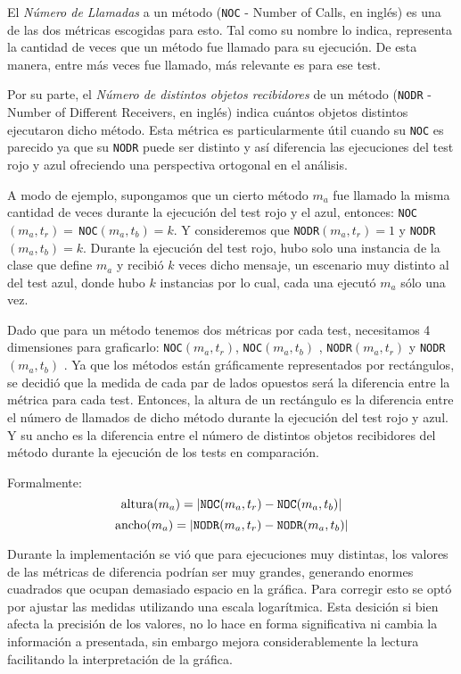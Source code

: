 \par El \emph{Número de Llamadas} a un método ({\tt NOC} - Number of Calls, en inglés) es una de las dos métricas escogidas para esto. Tal como su nombre lo indica, representa la cantidad de veces que un método fue llamado para su ejecución. De esta manera, entre más veces fue llamado, más relevante es para ese test.

\par Por su parte, el \emph{Número de distintos objetos recibidores} de un método ({\tt NODR} - Number of Different Receivers, en inglés) indica cuántos objetos distintos ejecutaron dicho método. Esta métrica es particularmente útil cuando su {\tt NOC} es parecido ya que su {\tt NODR} puede ser distinto y así diferencia las ejecuciones del test rojo y azul ofreciendo una perspectiva ortogonal en el análisis.

\par A modo de ejemplo, supongamos que un cierto método $m_a$ fue llamado la misma cantidad de veces durante la ejecución del test rojo y el azul, entonces: {\tt NOC}$(m_a,t_r) = \,${\tt NOC}$(m_a,t_b) = k$. Y consideremos que {\tt NODR}$(m_a,t_r) = 1$ y {\tt NODR}$(m_a,t_b) = k$. Durante la ejecución del test rojo, hubo solo una instancia de la clase que define $m_a$ y recibió $k$ veces dicho mensaje, un escenario muy distinto al del test azul, donde hubo $k$ instancias por lo cual, cada una ejecutó $m_a$ sólo una vez.

\par Dado que para un método tenemos dos métricas por cada test, necesitamos 4 dimensiones para graficarlo: {\tt NOC}$(m_a,t_r)$, {\tt NOC}$(m_a,t_b)$ , {\tt NODR}$(m_a,t_r)$ y {\tt NODR}$(m_a,t_b)$ . Ya que los métodos están gráficamente representados por rectángulos, se decidió que la medida de cada par de lados opuestos será la diferencia entre la métrica para cada test. Entonces, la altura de un rectángulo es la diferencia entre el número de llamados de dicho método durante la ejecución del test rojo y azul. Y su ancho es la diferencia entre el número de distintos objetos recibidores del método durante la ejecución de los tests en comparación. 

\par Formalmente:
\[ {\rm altura}(m_a) = \vert {\tt NOC}(m_a,t_r) - {\tt NOC}(m_a,t_b) \vert \]
\[ {\rm ancho}(m_a) = \vert {\tt NODR}(m_a,t_r) - {\tt NODR}(m_a,t_b) \vert \]

\par Durante la implementación se vió que para ejecuciones muy distintas, los valores de las métricas de diferencia podrían ser muy grandes, generando enormes cuadrados que ocupan demasiado espacio en la gráfica. Para corregir esto se optó por ajustar las medidas utilizando una escala logarítmica. Esta desición si bien afecta la precisión de los valores, no lo hace en forma significativa ni cambia la información a presentada, sin embargo mejora considerablemente la lectura facilitando la interpretación de la gráfica.

